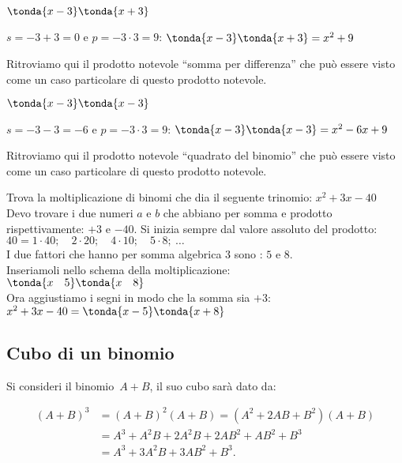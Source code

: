 \begin{esempio}
\(\tonda{x-3} \tonda{x+3}\)

\(s=-3+3=0\) \quad e \quad \(p=-3 \cdot 3=9\): \qquad 
\(\tonda{x-3} \tonda{x+3}=x^2+9\)

Ritroviamo qui il prodotto notevole ``somma per differenza'' che può essere 
visto come un caso particolare di questo prodotto notevole.
\end{esempio}

\begin{esempio}
\(\tonda{x-3} \tonda{x-3}\)

\(s=-3-3=-6\) \quad e \quad \(p=-3 \cdot 3=9\): \qquad 
\(\tonda{x-3} \tonda{x-3}=x^2-6x+9\)

Ritroviamo qui il prodotto notevole ``quadrato del binomio'' che può essere 
visto come un caso particolare di questo prodotto notevole.
\end{esempio}

\begin{esempio}
Trova la moltiplicazione di binomi che dia il seguente trinomio:
\(x^2+3x-40\)\\
Devo trovare i due numeri \(a\) e \(b\) che abbiano per somma e prodotto 
rispettivamente: \(+3\) e \(-40\). Si inizia sempre dal valore assoluto 
del prodotto:\\
\(40 = 1 \cdot 40; \quad 2 \cdot 20; \quad 4 \cdot 10; \quad 5 \cdot 8;~
\dots\)\\
I due fattori che hanno per somma algebrica \(3\) sono : \(5\) e \(8\).\\
Inseriamoli nello schema della moltiplicazione:\\
\(\tonda{x \quad 5} \tonda{x \quad 8}\)\\
Ora aggiustiamo i segni in modo che la somma sia \(+3\):\\
\(x^2+3x-40 = \tonda{x-5} \tonda{x+8}\)
\end{esempio}





\subsection{Cubo di un binomio}
\label{subsec:11_prodnot_cubo}

Si consideri il binomio~\(A+B\), il suo cubo sarà dato da:

\begin{align*}
\left(A+B\right)^{3}&=\left(A+B\right)^{2}\left(A+B\right)=\left(A^{2}+2{AB}
+B^{2}\right)\left(A+B\right)\\
&=A^{3}+A^{2}B+2A^{2}B+2{AB}^{2}+{AB}^{2}+B^{3}\\
&=A^{3}+3A^{2}B+3{AB}^{2}+B^{3}.
\end{align*}

